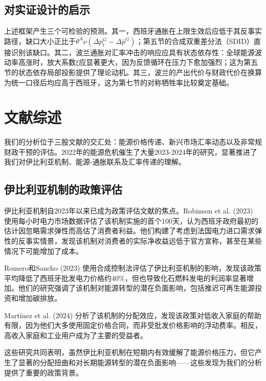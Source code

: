 \documentclass[12pt, a4paper]{article}
\begin{document}
\subsection{对实证设计的启示}

上述框架产生三个可检验的预测。其一，西班牙通胀在上限生效后应低于其反事实路径，缺口大小正比于$\theta^A \nu (\Delta p_t^G - \Delta \bar{p}^G)$；第五节的合成双重差分法（SDID）直接识别该缺口。其二，波兰通胀对汇率冲击的响应应具有状态依存性：全球能源波动率高涨时，放大系数$\xi$应显著更大，因为反馈循环在压力下愈加强烈；这为第五节的状态依存局部投影提供了理论动机。其三，波兰的产出代价与财政代价在换算为统一口径后均应高于西班牙，这为第七节的对称牺牲率比较奠定基础。



\section{文献综述}

我们的分析位于三股文献的交汇处：能源价格传递、新兴市场汇率动态以及非常规财政干预的评估。2022年的能源危机催生了大量2023-2024年的研究，显著推进了我们对伊比利亚机制、能源-通胀联系及汇率传递的理解。


\subsection{伊比利亚机制的政策评估}

伊比利亚机制自2023年以来已成为政策评估文献的焦点。Robinson et al. (2023) 使用每小时电力市场数据评估了该机制实施的首个100天，认为西班牙政府最初的估计因忽略需求弹性而高估了消费者利益。他们构建了考虑到法国电力进口需求弹性的反事实情景，发现该机制对消费者的实际净收益远低于官方宣称，甚至在某些情况下可能增加了成本。

Romero和Sancho (2023) 使用合成控制法评估了伊比利亚机制的影响，发现该政策平均降低了西班牙批发电力价格约40\%，但也导致化石燃料发电的利润率显著增加。他们的研究强调了该机制对能源转型的潜在负面影响，包括推迟可再生能源投资和增加碳排放。

Mart\'{i}nez et al. (2024) 分析了该机制的分配效应，发现该政策对低收入家庭的帮助有限，因为他们大多使用固定价格合同，而非受批发价格影响的浮动费率。相反，高收入家庭和工业用户成为了主要的受益者。

这些研究共同表明，虽然伊比利亚机制在短期内有效缓解了能源价格压力，但它产生了显著的分配扭曲和对长期能源转型的潜在负面影响——这些发现为我们的分析提供了重要的政策背景。
\end{document}
